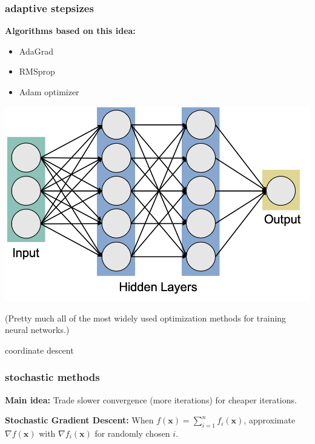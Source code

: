 \documentclass[compress]{beamer}
\newcommand{\bv}[1]{\mathbf{#1}}
\begin{document}
\begin{frame}
	\frametitle{adaptive stepsizes}
	\textbf{Algorithms based on this idea:}
	\begin{itemize}
		\item AdaGrad
		\item RMSprop
		\item Adam optimizer
	\end{itemize}
	\begin{center}
		\includegraphics[width=.5\textwidth]{neuralNetwork.png}
		
		\alert{(Pretty much all of the most widely used optimization methods for training neural networks.)}
	\end{center}
\end{frame}

\begin{frame}[standout]
	\begin{center}
		\large coordinate descent
	\end{center}
\end{frame}

\begin{frame}
	\frametitle{stochastic methods}
	\textbf{Main idea:} Trade slower convergence (more iterations) for cheaper iterations. 
	\vspace{2em}
	
	\textbf{Stochastic Gradient Descent:}
	When $f(\bv{x}) = \sum_{i=1}^n f_i(\bv{x})$, approximate $\nabla f(\bv{x})$ with $\nabla f_i(\bv{x})$ for randomly chosen $i$. 
\end{frame}
\end{document}
